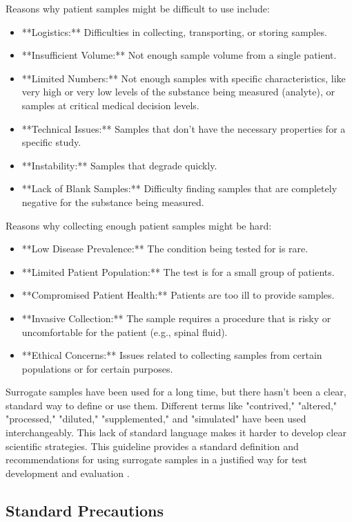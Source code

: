 \documentclass{article}
\begin{document}
Reasons why patient samples might be difficult to use include:
\begin{itemize}
    \item **Logistics:** Difficulties in collecting, transporting, or storing samples.
    \item **Insufficient Volume:** Not enough sample volume from a single patient.
    \item **Limited Numbers:** Not enough samples with specific characteristics, like very high or very low levels of the substance being measured (analyte), or samples at critical medical decision levels.
    \item **Technical Issues:** Samples that don't have the necessary properties for a specific study.
    \item **Instability:** Samples that degrade quickly.
    \item **Lack of Blank Samples:** Difficulty finding samples that are completely negative for the substance being measured.
\end{itemize}

Reasons why collecting enough patient samples might be hard:
\begin{itemize}
    \item **Low Disease Prevalence:** The condition being tested for is rare.
    \item **Limited Patient Population:** The test is for a small group of patients.
    \item **Compromised Patient Health:** Patients are too ill to provide samples.
    \item **Invasive Collection:** The sample requires a procedure that is risky or uncomfortable for the patient (e.g., spinal fluid).
    \item **Ethical Concerns:** Issues related to collecting samples from certain populations or for certain purposes.
\end{itemize}

Surrogate samples have been used for a long time, but there hasn't been a clear, standard way to define or use them. Different terms like "contrived," "altered," "processed," "diluted," "supplemented," and "simulated" have been used interchangeably. This lack of standard language makes it harder to develop clear scientific strategies. This guideline provides a standard definition and recommendations for using surrogate samples in a justified way for test development and evaluation \cite{CLSIEP39Ed1E}.

\subsection{Standard Precautions}
\end{document}
